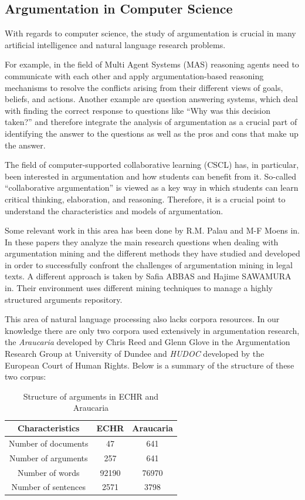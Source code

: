 \subsection{Argumentation in Computer Science}
\par
With regards to computer science, the study of argumentation is crucial in many artificial intelligence and natural language research problems.
\par
For example, in the field of Multi Agent Systems (MAS) reasoning agents need to communicate with each other and apply argumentation-based reasoning mechanisms to resolve the conflicts arising from their different views of goals, beliefs, and actions. Another example are question answering systems, which deal with finding the correct response to questions like ``Why was this decision taken?'' and therefore integrate the analysis of argumentation as a crucial part of identifying the answer to the questions as well as the pros and cons that make up the answer.
\par
The field of computer-supported collaborative learning (CSCL) has, in particular, been interested in argumentation and how students can benefit from it\cite{steg1}. So-called ``collaborative argumentation'' is viewed as a key way in which students can learn critical thinking, elaboration, and reasoning. Therefore, it is a crucial point to understand the characteristics and models of argumentation.
\par
Some relevant work in this area has been done by R.M. Palau and M-F Moens in\cite{palau1}\cite{palau2}. In these papers they analyze the main research questions when dealing with argumentation mining and the different methods they have studied and developed in order to successfully confront the challenges of argumentation mining in legal texts.
A different approach is taken by Safia ABBAS and Hajime SAWAMURA in\cite{safia}.  Their environment uses different mining techniques to manage a highly structured arguments repository.
\par
This area of natural language processing also lacks corpora resources. In our knowledge there are only two corpora used extensively in argumentation research, the \textit{Araucaria}\cite{araucaria}\cite{reed1} developed by Chris Reed and Glenn Glove in the Argumentation Research Group at University of Dundee and \textit{HUDOC} developed by the European Court of Human Rights\cite{echr}. Below is a summary of the structure of these two corpus:
\begin{table}[tbh]
\caption{Structure of arguments in ECHR and Araucaria}
\centering
\begin{tabular}{|c |c |c|}
\hline
Characteristics & ECHR & Araucaria \\
\hline
Number of documents & 47 & 641 \\
Number of arguments & 257 & 641 \\
Number of words & 92190 & 76970 \\
Number of sentences & 2571 & 3798 \\
\hline
\end{tabular}
\label{tab:eas}
\end{table}
